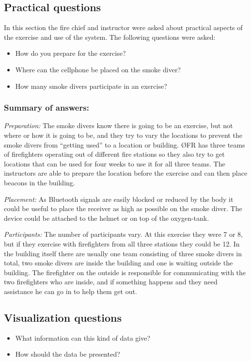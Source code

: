 \documentclass[../Main/thesis.tex]{subfiles}
\begin{document}
\subsection{Practical questions}
In this section the fire chief and instructor were asked about practical aspects of the exercise and use of the system.
The following questions were asked:
\begin{itemize}
	\item How do you prepare for the exercise?
	\item Where can the cellphone be placed on the smoke diver?
	\item How many smoke divers participate in an exercise?
\end{itemize}

\subsubsection*{Summary of answers:}
\textit{Preparation:} 
The smoke divers know there is going to be an exercise, but not where or how it is going to be, and they try to vary the locations to prevent the smoke divers from ``getting used'' to a location or building.
ØFR has three teams of firefighters operating out of different fire stations so they also try to get locations that can be used for four weeks to use it for all three teams.
The instructors are able to prepare the location before the exercise and can then place beacons in the building.

\textit{Placement:} 
As Bluetooth signals are easily blocked or reduced by the body it could be useful to place the receiver as high as possible on the smoke diver.
The device could be attached to the helmet or on top of the oxygen-tank.

\textit{Participants:} 
The number of participants vary.
At this exercise they were 7 or 8, but if they exercise with firefighters from all three stations they could be 12.
In the building itself there are usually one team consisting of three smoke divers in total, two smoke divers are inside the building and one is waiting outside the building.
The firefighter on the outside is responsible for communicating with the two firefighters who are inside, and if something happens and they need assistance he can go in to help them get out.

\subsection{Visualization questions}
\begin{itemize}
	\item What information can this kind of data give?
	\item How should the data be presented?
\end{itemize}
\end{document}
